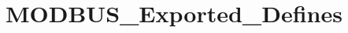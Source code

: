\hypertarget{group___m_o_d_b_u_s___exported___defines}{}\section{M\+O\+D\+B\+U\+S\+\_\+\+Exported\+\_\+\+Defines}
\label{group___m_o_d_b_u_s___exported___defines}
